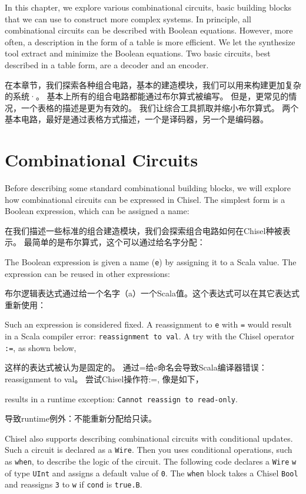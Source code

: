 \documentclass[%
    10pt,
    headinclude, footexclude,
    openright, %
    notitlepage,
    cleardoubleempty,
    headsepline,
    pointlessnumbers,
    bibtotoc, idxtotoc,
    ]{scrbook}
\newcommand{\code}[1]{{\small{\texttt{#1}}}}
\begin{document}
In this chapter, we explore various combinational circuits, basic building blocks that we can
use to construct more complex systems.
In principle, all combinational circuits can be described with Boolean equations.
However, more often, a description in the form of a table is more efficient.
We let the synthesize tool extract and minimize the Boolean equations.
Two basic circuits, best described in a table form, are a decoder and an encoder.

在本章节，我们探索各种组合电路，基本的建造模块，我们可以用来构建更加复杂的系统·。
基本上所有的组合电路都能通过布尔算式被编写。
但是，更常见的情况，一个表格的描述是更为有效的。
我们让综合工具抓取并缩小布尔算式。
两个基本电路，最好是通过表格方式描述，一个是译码器，另一个是编码器。

\section{Combinational Circuits}

Before describing some standard combinational building blocks, we will explore
how combinational circuits can be expressed in Chisel.
The simplest form is a Boolean expression, which can be assigned a name:

在我们描述一些标准的组合建造模块，我们会探索组合电路如何在Chisel种被表示。
最简单的是布尔算式，这个可以通过给名字分配：


\noindent The Boolean expression is given a name (\code{e}) by assigning it
to a Scala value. The expression can be reused in other expressions:

布尔逻辑表达式通过给一个名字（a）一个Scala值。这个表达式可以在其它表达式重新使用：


Such an expression is considered fixed. A reassignment to \code{e}
with \code{=} would result in a Scala compiler error: \code{reassignment to val}.
A try with the Chisel operator \code{:=}, as shown below,

这样的表达式被认为是固定的。
通过=给e命名会导致Scala编译器错误：reassignment to val。
尝试Chisel操作符:=, 像是如下，


\noindent results in a runtime exception: \code{Cannot reassign to read-only}.

导致runtime例外：不能重新分配给只读。

Chisel also supports describing combinational circuits with conditional updates.
Such a circuit is declared as a \code{Wire}. Then you uses conditional operations,
such as \code{when}, to describe the logic of the circuit.
The following code declares a \code{Wire} \code{w} of type \code{UInt} and assigns a default
value of \code{0}. The \code{when} block takes a Chisel \code{Bool} and reassigns
\code{3} to \code{w} if \code{cond} is \code{true.B}.
\end{document}
